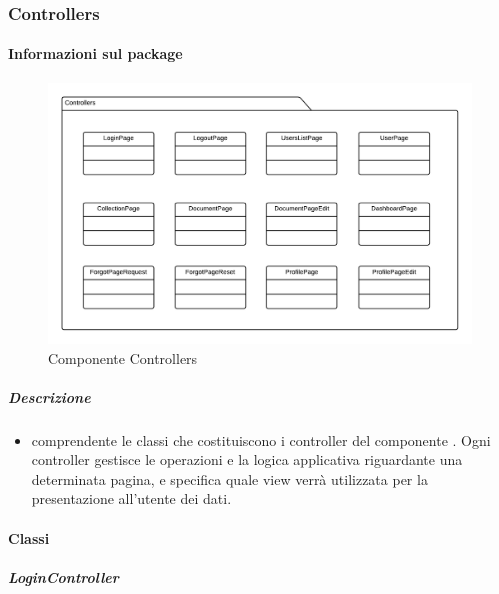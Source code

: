   \subsubsection{Controllers}
  \paragraph{Informazioni sul package}
    \begin{figure}[H] 
      \begin{center}
        \includegraphics[width=\textwidth]{uml/package/Front-end::Controllers.png}
        \caption{Componente Controllers}
      \end{center}  
    \end{figure} 
  \subparagraph{Descrizione} 
    \begin{itemize}
    \item[]  comprendente le classi che costituiscono i controller del componente . Ogni controller gestisce le operazioni e la logica applicativa riguardante una determinata pagina, e specifica quale view verrà utilizzata per la presentazione all'utente dei dati.
    \end{itemize} 
    \paragraph{Classi}
      \subparagraph{LoginController}
        
